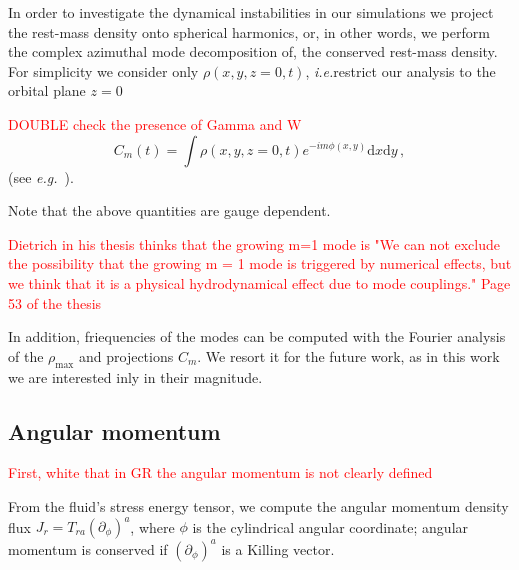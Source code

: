 \documentclass[11pt,a4paper,headinclude=true,DIV=14,BCOR=8mm,chapterprefix,listof=totoc,twoside,openright,abstracton]{scrbook}
\newcommand{\red}[1]{\textcolor{red}{#1}}
\newcommand{\ie}{\textit{i.e.}}
\newcommand{\eg}{\textit{e.g.}}
\begin{document}
In order to investigate the dynamical instabilities in our simulations we 
project the rest-mass density onto spherical harmonics,
or, in other words, we perform the complex azimuthal mode decomposition of,
the conserved rest-mass density.
For simplicity we consider only $\rho(x,y,z=0,t)$, 
\ie restrict our analysis to the orbital plane $z=0$

\red{DOUBLE check the presence of Gamma and W}
\begin{equation}
    \label{eq:modes}
    C_m(t) = \int \rho(x,y,z=0,t) e^{-i m \phi(x,y)} \text{d}x \text{d} y \, ,
\end{equation}
(see \eg~\citet{Baiotti:2009gk}).


Note that the above quantities are gauge dependent.

\red{Dietrich in his thesis thinks that the growing m=1 mode is "We can not
    exclude the possibility that the growing m = 1 mode is triggered by numerical effects,
    but we think that it is a physical hydrodynamical effect due to mode couplings."
    Page 53 of the thesis
}

In addition, friequencies of the modes can be computed with the Fourier analysis of the $\rho_{\text{max}}$ and projections $C_{m}$. We resort it for the future work, as in this work we are interested inly in their magnitude. 





\subsection{Angular momentum}

\red{First, white that in GR the angular momentum is not clearly defined}


From the fluid's stress energy tensor,
we compute the angular momentum density flux $J_r = T_{ra}(\partial_\phi)^a$,
where $\phi$ is the cylindrical angular coordinate;
angular momentum is conserved if $(\partial_\phi)^a$ is a Killing vector.
\end{document}
